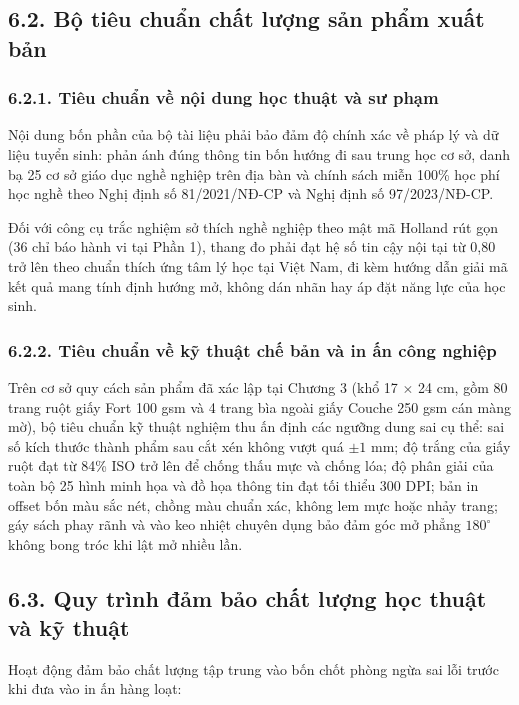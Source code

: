 \subsection{6.2. Bộ tiêu chuẩn chất lượng sản phẩm xuất bản}

\subsubsection{6.2.1. Tiêu chuẩn về nội dung học thuật và sư phạm}

Nội dung bốn phần của bộ tài liệu phải bảo đảm độ chính xác về pháp lý và dữ liệu tuyển sinh: phản ánh đúng thông tin bốn hướng đi sau trung học cơ sở, danh bạ 25 cơ sở giáo dục nghề nghiệp trên địa bàn và chính sách miễn 100\% học phí học nghề theo Nghị định số 81/2021/NĐ-CP và Nghị định số 97/2023/NĐ-CP.

Đối với công cụ trắc nghiệm sở thích nghề nghiệp theo mật mã Holland rút gọn (36 chỉ báo hành vi tại Phần 1), thang đo phải đạt hệ số tin cậy nội tại từ 0,80 trở lên theo chuẩn thích ứng tâm lý học tại Việt Nam, đi kèm hướng dẫn giải mã kết quả mang tính định hướng mở, không dán nhãn hay áp đặt năng lực của học sinh.

\subsubsection{6.2.2. Tiêu chuẩn về kỹ thuật chế bản và in ấn công nghiệp}

Trên cơ sở quy cách sản phẩm đã xác lập tại Chương 3 (khổ 17 $\times$ 24 cm, gồm 80 trang ruột giấy Fort 100 gsm và 4 trang bìa ngoài giấy Couche 250 gsm cán màng mờ), bộ tiêu chuẩn kỹ thuật nghiệm thu ấn định các ngưỡng dung sai cụ thể: sai số kích thước thành phẩm sau cắt xén không vượt quá $\pm 1\text{ mm}$; độ trắng của giấy ruột đạt từ 84\% ISO trở lên để chống thấu mực và chống lóa; độ phân giải của toàn bộ 25 hình minh họa và đồ họa thông tin đạt tối thiểu 300 DPI; bản in offset bốn màu sắc nét, chồng màu chuẩn xác, không lem mực hoặc nhảy trang; gáy sách phay rãnh và vào keo nhiệt chuyên dụng bảo đảm góc mở phẳng $180^\circ$ không bong tróc khi lật mở nhiều lần.

\subsection{6.3. Quy trình đảm bảo chất lượng học thuật và kỹ thuật}

Hoạt động đảm bảo chất lượng tập trung vào bốn chốt phòng ngừa sai lỗi trước khi đưa vào in ấn hàng loạt:


